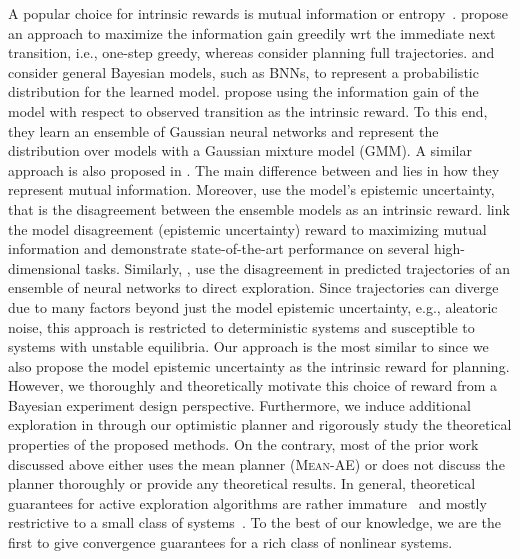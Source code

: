 A popular choice for intrinsic rewards is mutual information or entropy~\citep{learning_and_control_using_gps, active_learning_gp, max, pathak2019self, sekar2020planning}. \cite{learning_and_control_using_gps} propose an
approach to maximize the information gain greedily wrt the immediate next transition, i.e., one-step greedy, whereas \cite{active_learning_gp} consider planning full trajectories.
\cite{max, pathak2019self, sekar2020planning} and \cite{Sancaktaretal22} consider general Bayesian models, such as BNNs, to represent a probabilistic distribution for the learned model. 
\cite{max} propose using the information gain of the model with respect to observed transition as the intrinsic reward. %
To this end, they learn an ensemble of Gaussian neural networks and represent the distribution over models with a Gaussian mixture model (GMM). A similar approach is also proposed in \cite{pathak2019self, sekar2020planning, Sancaktaretal22}. The main difference between \cite{max} and \cite{pathak2019self} lies in how they represent mutual information. Moreover, \cite{pathak2019self} use the model's epistemic uncertainty, that is the disagreement between the ensemble models as an intrinsic reward. \cite{sekar2020planning} link the model disagreement (epistemic uncertainty) reward to maximizing mutual information and demonstrate state-of-the-art performance on several high-dimensional tasks. 
Similarly, \cite{Sancaktaretal22}, use the disagreement in predicted trajectories of an ensemble of neural networks to direct exploration. Since trajectories can diverge due to many factors beyond just the model epistemic uncertainty, e.g., aleatoric noise, this approach is restricted to deterministic systems and susceptible to systems with unstable equilibria. 
Our approach is the most similar to \cite{pathak2019self, sekar2020planning} since we also propose the model epistemic uncertainty as the intrinsic reward for planning. However, we thoroughly and theoretically motivate this choice of reward from a Bayesian experiment design perspective. Furthermore,
we induce additional exploration in \opacex through our optimistic planner and rigorously study the theoretical properties of the proposed methods. On the contrary, most of the prior work discussed above either uses the mean planner (\textsc{Mean-AE}) or does not discuss the planner thoroughly or provide any theoretical results. In general, theoretical guarantees for active exploration algorithms are rather immature~\citep{chakraborty2023steering, wagenmaker2023optimal} and mostly restrictive to a small class of systems~\citep{simchowitz2018learning, tarbouriech2020active, wagenmaker2020active, mania2020active}. %
To the best of our knowledge, we are the first to give convergence guarantees for a rich class of nonlinear systems.

